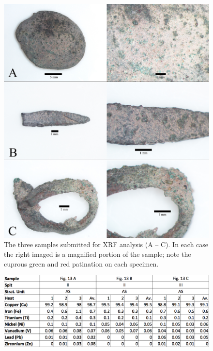 \documentclass{ijsra}
\begin{document}
	\begin{figure} %
		\includegraphics[width=\linewidth]{figures/Forssman-Figure12}
		\caption{The three samples submitted for XRF analysis (A – C). In each case the right imaged is a magnified portion of the sample; note the cuprous green and red patination on each specimen.}
		\label{fig:Forssman-Figure12}
	\end{figure}

    	\begin{figure} %
    		\includegraphics[width=\linewidth]{figures/Forssman-Table06}
    		\centering
    		\label{fig:Forssman-Table06}
    	\end{figure}
\end{document}
